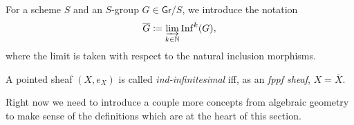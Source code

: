\begin{ntt}\label{not:GBar}
	For a scheme $S$ and an $S$-group $G \in \mathsf{Gr}/S$, we introduce
	the notation 
	\begin{equation*}
	\overline{G} \coloneqq \varinjlim_{k \in \mathbb{N}} \operatorname{Inf}^k(G)
	,\end{equation*}
	where the limit is taken with respect to the natural inclusion morphisms.
\end{ntt} 


\begin{defn}
	A pointed sheaf $\left(X, e_X\right)$ is called \emph{ind-infinitesimal} iff,
	as an \emph{fppf sheaf}, $X = \overline{X}$.
\end{defn}


\noindent
Right now we need to introduce a couple more concepts from algebraic
geometry to make sense of the definitions which are at the heart of this section.
%


